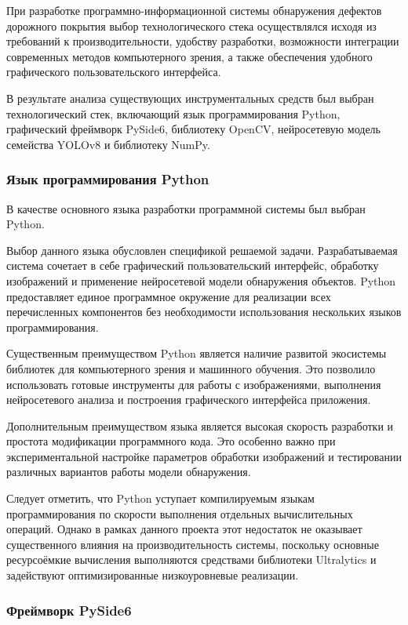 При разработке программно-информационной системы обнаружения дефектов дорожного покрытия выбор технологического стека осуществлялся исходя из требований к производительности, удобству разработки, возможности интеграции современных методов компьютерного зрения, а также обеспечения удобного графического пользовательского интерфейса.

В результате анализа существующих инструментальных средств был выбран технологический стек, включающий язык программирования Python, графический фреймворк PySide6, библиотеку OpenCV, нейросетевую модель семейства YOLOv8 и библиотеку NumPy.

\subsubsection{Язык программирования Python}

В качестве основного языка разработки программной системы был выбран Python.

Выбор данного языка обусловлен спецификой решаемой задачи. Разрабатываемая система сочетает в себе графический пользовательский интерфейс, обработку изображений и применение нейросетевой модели обнаружения объектов. Python предоставляет единое программное окружение для реализации всех перечисленных компонентов без необходимости использования нескольких языков программирования.

Существенным преимуществом Python является наличие развитой экосистемы библиотек для компьютерного зрения и машинного обучения. Это позволило использовать готовые инструменты для работы с изображениями, выполнения нейросетевого анализа и построения графического интерфейса приложения.

Дополнительным преимуществом языка является высокая скорость разработки и простота модификации программного кода. Это особенно важно при экспериментальной настройке параметров обработки изображений и тестировании различных вариантов работы модели обнаружения.

Следует отметить, что Python уступает компилируемым языкам программирования по скорости выполнения отдельных вычислительных операций. Однако в рамках данного проекта этот недостаток не оказывает существенного влияния на производительность системы, поскольку основные ресурсоёмкие вычисления выполняются средствами библиотеки Ultralytics и задействуют оптимизированные низкоуровневые реализации.

\subsubsection{Фреймворк PySide6}

